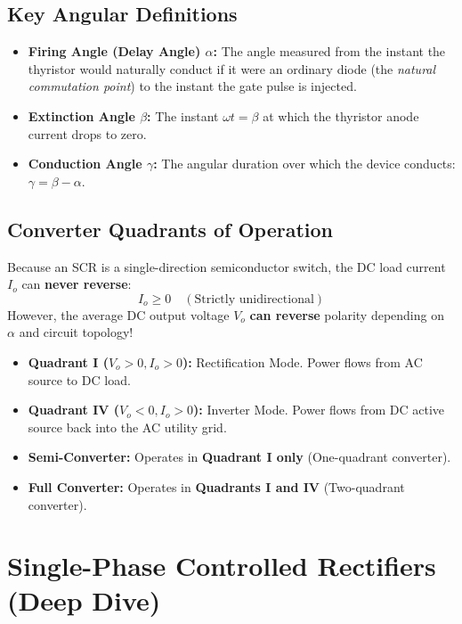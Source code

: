 \documentclass[11pt,a4paper]{article}
\begin{document}
\subsection{Key Angular Definitions}
\begin{itemize}[leftmargin=*]
  \item \textbf{Firing Angle (Delay Angle) $\alpha$:} The angle measured from the instant the thyristor would naturally conduct if it were an ordinary diode (the \textit{natural commutation point}) to the instant the gate pulse is injected.
  \item \textbf{Extinction Angle $\beta$:} The instant $\omega t = \beta$ at which the thyristor anode current drops to zero.
  \item \textbf{Conduction Angle $\gamma$:} The angular duration over which the device conducts: $\gamma = \beta - \alpha$.
\end{itemize}

\subsection{Converter Quadrants of Operation}
\begin{conceptbox}
Because an SCR is a single-direction semiconductor switch, the DC load current $I_o$ can \textbf{never reverse}:
\[
I_o \ge 0 \quad (\text{Strictly unidirectional})
\]
However, the average DC output voltage $V_o$ \textbf{can reverse} polarity depending on $\alpha$ and circuit topology!
\begin{itemize}[leftmargin=*]
  \item \textbf{Quadrant I ($V_o > 0, I_o > 0$):} Rectification Mode. Power flows from AC source to DC load.
  \item \textbf{Quadrant IV ($V_o < 0, I_o > 0$):} Inverter Mode. Power flows from DC active source back into the AC utility grid.
  \item \textbf{Semi-Converter:} Operates in \textbf{Quadrant I only} (One-quadrant converter).
  \item \textbf{Full Converter:} Operates in \textbf{Quadrants I and IV} (Two-quadrant converter).
\end{itemize}
\end{conceptbox}

\section{Single-Phase Controlled Rectifiers (Deep Dive)}
\end{document}
